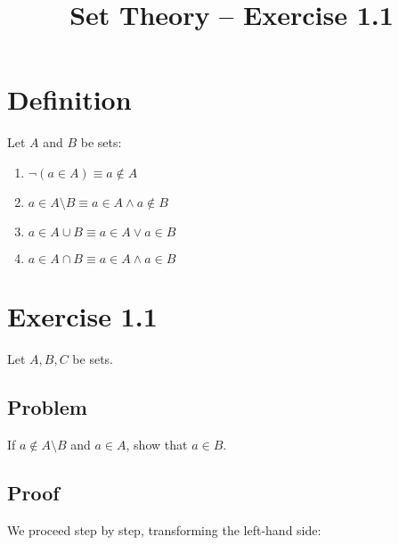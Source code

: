 \documentclass[12pt]{article}
\title{\textbf{Set Theory – Exercise 1.1}}
\author{}
\date{}
\begin{document}
\maketitle

\section*{Definition}

Let \( A \) and \( B \) be sets:

\begin{enumerate}
    \item \( \neg(a \in A) \equiv a \notin A \)
    \item \( a \in A \setminus B \equiv a \in A \land a \notin B \)
    \item \( a \in A \cup B \equiv a \in A \lor a \in B \)
    \item \( a \in A \cap B \equiv a \in A \land a \in B \)
\end{enumerate}

\section*{Exercise 1.1}

Let \( A, B, C \) be sets.

\subsection*{Problem}

If \( a \notin A \setminus B \) and \( a \in A \), show that \( a \in B \).

\subsection*{Proof}

We proceed step by step, transforming the left-hand side:
\end{document}
